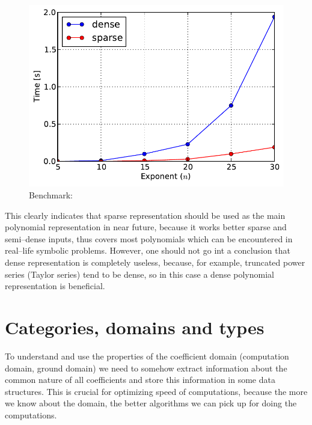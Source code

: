 \begin{figure}[htbp]
\centering

\includegraphics{sparse-power.pdf}
\caption{Benchmark:\label{fig-sparse-power}}\end{figure}

This clearly indicates that sparse representation should be used as the main polynomial
representation in near future, because it works better sparse and semi--dense inputs,
thus covers most polynomials which can be encountered in real--life symbolic problems.
However, one should not go int a conclusion that dense representation is completely
useless, because, for example, truncated power series (Taylor series) tend to be dense,
so in this case a dense polynomial representation is beneficial.


\section{Categories, domains and types}

To understand and use the properties of the coefficient domain (computation domain, ground domain)
we need to somehow extract information about the common nature of all coefficients and store this
information in some data structures. This is crucial for optimizing speed of computations, because
the more we know about the domain, the better algorithms we can pick up for doing the computations.


